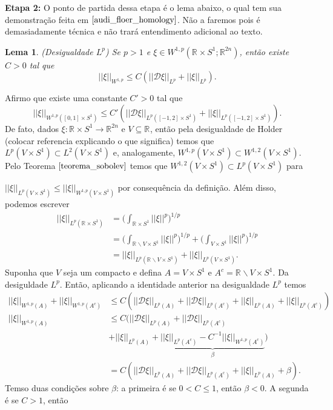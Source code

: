 \documentclass[12pt]{book}
\newtheorem{lema}[teorema]{Lema}
\newcommand{\circulo}{S^{1}}
\newcommand{\diferebcialmapafloerabrev}{\mathcal{D}}
\newcommand{\espacoLdois}[1]{L^{2}(#1)}
\newcommand{\espacoLp}[1]{L^{p}(#1)}
\newcommand{\espacosobolev}[1]{W^{1,p}(#1)}
\newcommand{\espacosobolevcontradominio}[2]{W^{1,p}(#1;#2)}
\newcommand{\espacosobolevretacirculo}{\espacosobolevcontradominio{\retacartesianocirculo}{\real{2n}}}
\newcommand{\espacosobolevgeral}[2]{W^{1,#1}(#2)}
\newcommand{\norma}[1]{||#1||}
\newcommand{\normaLp}[1]{||#1||_{L^{p}}}
\newcommand{\normaLpdefinicao}[2]{ \Big(\int_{#2}#1^{p}\Big)^{1/p}}
\newcommand{\normaLpDominio}[2]{||#1||_{L^{p}(#2)}}
\newcommand{\normaWp}[1]{||#1||_{W^{1,p}}}
\newcommand{\normaWpDominio}[2]{||#1||_{W^{1,p}(#2)}}
\newcommand{\retacartesianocirculo}{\real{} \times \circulo}
\newcommand{\real}[1]{\mathbb{R}^{#1}}
\newcommand{\reta}{\real{}}
\newcommand{\vermelho}[1]{{\color{red}#1}}
\begin{document}
	\textbf{Etapa 2:}
	O ponto de partida dessa etapa é o lema abaixo, o qual tem sua demonstração feita em $\cite{audi_floer_homology}$. Não a faremos pois é demasiadamente técnica e não trará entendimento adicional ao texto.
	
	\begin{lema}\label{lema_desigualdade_Lp}
		(Desigualdade $L^{p}$) Se $p>1$ e $\xi \in \espacosobolevretacirculo$, então existe $C>0$ tal que
		$$
		\normaWp{\xi} \leq C(\normaLp{\diferebcialmapafloerabrev \xi}+\normaLp{\xi}).
		$$
	\end{lema}
	
	Afirmo que existe uma constante $C'>0$ tal que
	$$
	\normaWpDominio{\xi}{[0,1]\times \circulo} \leq C'(\normaLpDominio{\diferebcialmapafloerabrev \xi}{[-1,2]\times \circulo}+\normaLpDominio{\xi}{[-1,2]\times \circulo}).
	$$
	De fato, dados $\xi:\retacartesianocirculo\to\real{2n}$ e $V \subseteq \reta$, então pela desigualdade de Holder \vermelho{(colocar referencia explicando o que significa)} temos que $\espacoLp{V\times \circulo} \subset \espacoLdois{V\times \circulo}$ e, analogamente, $\espacosobolev{V\times \circulo} \subset \espacosobolevgeral{2}{V\times \circulo}$. Pelo Teorema $\ref{teorema_sobolev}$ temos que $\espacosobolevgeral{2}{V\times \circulo} \subset \espacoLp{V\times \circulo}$ para 
	
	
	
	
	$\normaLpDominio{\xi}{V\times \circulo} \leq \normaWpDominio{\xi}{V \times \circulo}$ por consequência da definição. Além disso, podemos escrever
	$$
	\begin{aligned}
	\normaLpDominio{\xi}{\retacartesianocirculo} 
	&= \normaLpdefinicao{\norma{\xi}}{\retacartesianocirculo} 
	\\
	&= \normaLpdefinicao{\norma{\xi}}{\reta\backslash V \times \circulo}+\normaLpdefinicao{\norma{\xi}}{V\times \circulo} 
	\\
	&= \normaLpDominio{\xi}{\reta\backslash V \times \circulo} +\normaLpDominio{\xi}{V\times \circulo}.
	\end{aligned}
	$$
	Suponha que $V$ seja um compacto e defina $A = V \times \circulo$ e $A^{c} = \reta\backslash V\times \circulo$. Da desiguldade $L^{p}$. Então, aplicando a identidade anterior na desigualdade $L^{p}$ temos
	$$
	\begin{aligned}
		\normaWpDominio{\xi}{A} + \normaWpDominio{\xi}{A^{c}}
		&\leq C(\normaLpDominio{\diferebcialmapafloerabrev \xi}{A}+\normaLpDominio{\diferebcialmapafloerabrev \xi}{A^{c}}+\normaLpDominio{\xi}{A}+\normaLpDominio{\xi}{A^{c}})
		\\
		\normaWpDominio{\xi}{A} 
		&\leq C(\normaLpDominio{\diferebcialmapafloerabrev \xi}{A}+\normaLpDominio{\diferebcialmapafloerabrev \xi}{A^{c}}
		\\
		&+\normaLpDominio{\xi}{A}+\underbrace{\normaLpDominio{\xi}{A^{c}} -C^{-1}\normaWpDominio{\xi}{A^{c}}}_{\beta})
		\\
		&=C(\normaLpDominio{\diferebcialmapafloerabrev \xi}{A}+\normaLpDominio{\diferebcialmapafloerabrev \xi}{A^{c}}+\normaLpDominio{\xi}{A}+ \beta).
	\end{aligned}
	$$
	Temso duas condições sobre $\beta$: a primeira é se $0<C\leq 1$, então $\beta<0$. A segunda é se $C>1$, então 
		
\end{document}
